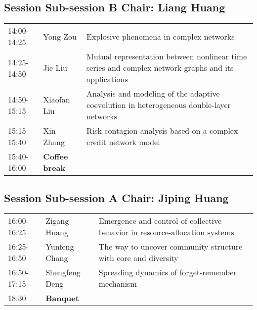 \documentclass[oneside,A4paper,12pt]{article}
\begin{document}
\subsection*{Session \uppercase\expandafter{} \hspace{10mm} Sub-session B \hspace{10mm} Chair: Liang Huang}
\label{sec:org63fa7b7}

\begin{center}
\begin{tabular}{p{2.5cm}p{4cm}p{8.5cm}}
\hline
14:00-14:25 & Yong Zou & Explosive phenomena in complex networks\\
14:25-14:50 & Jie Liu & Mutual representation between nonlinear time series and complex network graphs and its applications\\
14:50-15:15 & Xiaofan Liu & Analysis and modeling of the adaptive coevolution in heterogeneous double-layer networks\\
15:15-15:40 & Xin Zhang & Risk contagion analysis based on a complex credit network model\\
\cellcolor{blue!25}15:40-16:00 & \cellcolor{blue!25}\textbf{Coffee break} & \cellcolor{blue!25}\\
\hline
\end{tabular}
\end{center}

\newpage

\subsection*{Session \uppercase\expandafter{} \hspace{10mm} Sub-session A \hspace{10mm} Chair: Jiping Huang}
\label{sec:orgd1cea20}

\begin{center}
\begin{tabular}{p{2.5cm}p{4cm}p{8.5cm}}
\hline
16:00-16:25 & Zigang Huang & Emergence and control of collective behavior in resource-allocation systems\\
16:25-16:50 & Yunfeng Chang & The way to uncover community structure with core and diversity\\
16:50-17:15 & Shengfeng Deng & Spreading dynamics of forget-remember mechanism\\
\cellcolor{blue!25}18:30 & \cellcolor{blue!25} \textbf{Banquet} & \cellcolor{blue!25}\\
\hline
\end{tabular}
\end{center}
\end{document}
